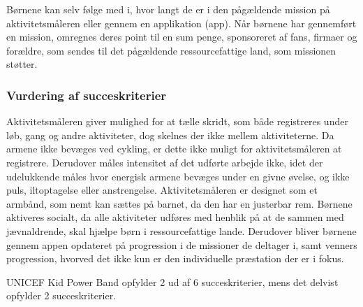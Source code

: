 Børnene kan selv følge med i, hvor langt de er i den pågældende mission på aktivitetsmåleren eller gennem en applikation (app). Når børnene har gennemført en mission, omregnes deres point til en sum penge, sponsoreret af fans, firmaer og forældre, som sendes til det pågældende ressourcefattige land, som missionen støtter. \newline

\subsubsection{Vurdering af succeskriterier}
Aktivitetsmåleren giver mulighed for at tælle skridt, som både registreres under løb, gang og andre aktiviteter, dog skelnes der ikke mellem aktiviteterne. Da armene ikke bevæges ved cykling, er dette ikke muligt for aktivitetsmåleren at registrere. Derudover måles intensitet af det udførte arbejde ikke, idet der udelukkende måles hvor energisk armene bevæges under en givne øvelse, og ikke puls, iltoptagelse eller anstrengelse. Aktivitetsmåleren er designet som et armbånd, som nemt kan sættes på barnet, da den har en justerbar rem. \citep{PowerManual2015} \newline
Børnene aktiveres socialt, da alle aktiviteter udføres med henblik på at de sammen med jævnaldrende, skal hjælpe børn i ressourcefattige lande. Derudover bliver børnene gennem appen opdateret på progression i de missioner de deltager i, samt venners progression, hvorved det ikke kun er den individuelle præstation der er i fokus. %
\citep{PowerAbout2015} 

UNICEF Kid Power Band opfylder 2 ud af 6 succeskriterier, mens det delvist opfylder 2 succeskriterier.

